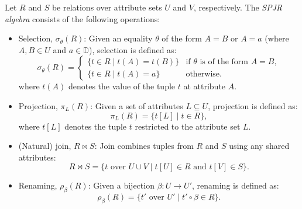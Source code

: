 \documentclass[oneside, 11pt]{amsbook}
\theoremstyle{plain}
\theoremstyle{definition}
\theoremstyle{remark}
\begin{document}
\begin{defn}
    \label{defn:spjr}
    Let $R$ and $S$ be relations over attribute sets $U$ and $V$, respectively. The \emph{SPJR algebra} consists of the following operations:
    \begin{itemize}
        \item Selection, $\sigma_\theta(R)$: Given an equality $\theta$ of the form $A=B$ or $A=a$ (where $A, B \in U$ and $a \in \mathbb{D}$), selection is defined as:
              \[
                  \sigma_\theta(R) =
                  \begin{cases}
                      \{ t \in R \mid t(A) = t(B) \} & \text{if } \theta \text{ is of the form } A=B, \\
                      \{ t \in R \mid t(A) = a \}    & \text{otherwise.}
                  \end{cases}
              \]
              where $t(A)$ denotes the value of the tuple $t$ at attribute $A$.
        \item Projection, $\pi_L(R)$: Given a set of attributes $L \subseteq U$, projection is defined as:
              \[
                  \pi_L(R) = \{ t[L] \mid t \in R \},
              \]
              where $t[L]$ denotes the tuple $t$ restricted to the attribute set $L$.
        \item (Natural) join, $R \bowtie S$: Join combines tuples from $R$ and $S$ using any shared attributes:
              \[
                  R \bowtie S = \{ t \text{ over } U \cup V \mid t[U] \in R \text{ and } t[V] \in S \}.
              \]
        \item Renaming, $\rho_\beta(R)$: Given a bijection $\beta: U \to U'$, renaming is defined as:
              \[ \rho_\beta(R) = \{ t' \text{ over } U' \mid t' \circ \beta \in R \}. \]
    \end{itemize}
\end{defn}
\end{document}
